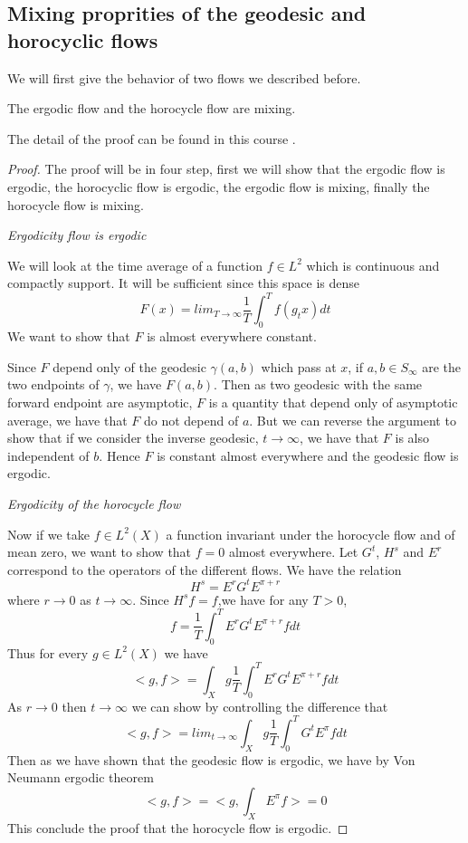 \subsection{Mixing proprities of the geodesic and horocyclic flows}

We will first give the behavior of two flows we described before.

\begin{thm}
The ergodic flow and the horocycle flow are mixing.
\end{thm}
The detail of the proof can be found in this course \cite{Mcmullen1998HyperbolicM}.

\begin{proof}
The proof will be in four step, first we will show that the ergodic flow is ergodic, the horocyclic flow is ergodic, the ergodic flow is mixing, finally the horocycle flow is mixing.

\emph{Ergodicity flow is ergodic}

We will look at the time average of a function $f \in L^2$ which is continuous and compactly support. It will be sufficient since this space is dense \[
F(x) = lim_{T \to \infty} \frac{1}{T} \int_0^T f(g_t x)dt
\]
We want to show that $F$ is almost everywhere constant.

Since $F$ depend only of the geodesic $\gamma(a,b)$ which pass at $x$, if $a,b \in S_\infty$ are the two endpoints of $\gamma$, we have $F(a,b)$.
Then as two geodesic with the same forward endpoint are asymptotic, $F$ is a quantity that depend only of asymptotic average, we have that $F$ do not depend of $a$.
But we can reverse the argument to show that if we consider the inverse geodesic, $t \to \infty$, we have that $F$ is also independent of $b$. Hence $F$ is constant almost everywhere and the geodesic flow is ergodic.

\emph{Ergodicity of the horocycle flow}

Now if we take $f \in L^2(X)$ a function invariant under the horocycle flow and of mean zero, we want to show that $f=0$ almost everywhere.
Let $G^t$, $H^s$ and $E^r$ correspond to the operators of the different flows. We have the relation \[
H^s=E^r G^t E^{\pi+r}
\]
where $r \to 0$ as $t \to \infty$. Since $H^s f=f$,we have for any $T>0$,\[
f=\frac{1}{T} \int_0^T E^r G^t E^{\pi+r} f dt
\]
Thus for every $g \in L^2(X)$ we have \[
<g,f> = \int_X g \frac{1}{T} \int_0^T E^r G^t E^{\pi+r} f dt
\]
As $r \to 0$ then $t \to \infty$ we can show by controlling the difference that \[
<g,f> = lim_{t \to \infty} \int_X g \frac{1}{T} \int_0^T G^t E^{\pi} f dt
\]
Then as we have shown that the geodesic flow is ergodic, we have by Von Neumann ergodic theorem\[
<g,f> = <g,\int_X E^{\pi} f> =0
\]
This conclude the proof that the horocycle flow is ergodic.


\end{proof}
